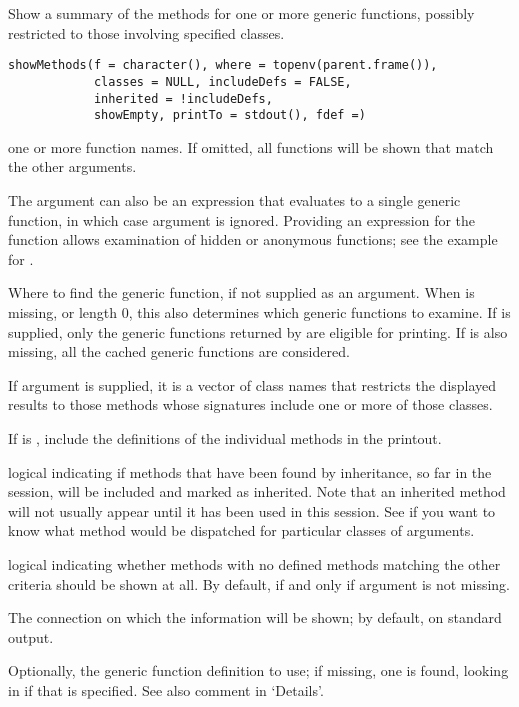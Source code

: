 %
\begin{Description}\relax
Show a summary of the methods for one or more generic functions,
possibly restricted to those involving specified classes.
\end{Description}
%
\begin{Usage}
\begin{verbatim}
showMethods(f = character(), where = topenv(parent.frame()),
            classes = NULL, includeDefs = FALSE,
            inherited = !includeDefs,
            showEmpty, printTo = stdout(), fdef =)
\end{verbatim}
\end{Usage}
%
\begin{Arguments}
\begin{ldescription}
\item[\code{f}] one or more function names.  If omitted, all functions
will be shown that match the other arguments.

The argument can also be an expression that evaluates to a single
generic function, in which
case argument  is ignored.  Providing an expression for
the function allows examination of hidden or anonymous functions;
see the example for .
\item[\code{where}] Where to find the generic function, if not supplied as an
argument. When  is missing, or length 0, this also
determines which generic functions to examine.  If  is
supplied, only the generic functions returned by
 are eligible for printing.  If
 is also missing, all the cached generic functions are
considered.
\item[\code{classes}] If argument  is supplied, it is a vector
of class names that restricts the displayed results to those methods
whose signatures include one or more of those classes.
\item[\code{includeDefs}] If  is , include the
definitions of the individual methods in the printout.
\item[\code{inherited}] logical indicating if methods that have been found by
inheritance, so far in the session, will be included and marked as
inherited.  Note that an inherited method will not usually appear
until it has been used in this session.  See
 if you want to know what method would be
dispatched for particular classes of arguments.
\item[\code{showEmpty}] logical indicating whether methods with no defined
methods matching the other criteria should be shown at all.  By
default,  if and only if argument  is not
missing.
\item[\code{printTo}] The connection on which the information will be
shown; by default, on standard output.
\item[\code{fdef}] Optionally, the generic function definition to use; if
missing, one is found, looking in  if that is specified.
See also comment in `Details'.
\end{ldescription}
\end{Arguments}
